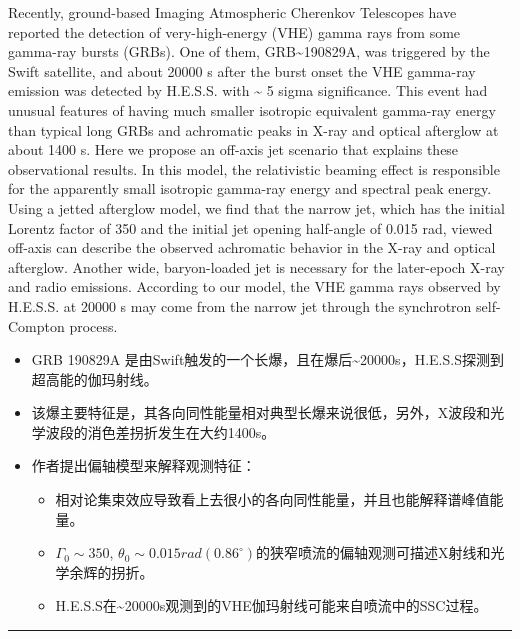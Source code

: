\documentclass[
]{article}
\begin{document}
Recently, ground-based Imaging Atmospheric Cherenkov Telescopes have
reported the detection of very-high-energy (VHE) gamma rays from some
gamma-ray bursts (GRBs). One of them, GRB\textasciitilde190829A, was
triggered by the Swift satellite, and about 20000 s after the burst
onset the VHE gamma-ray emission was detected by H.E.S.S. with
\textasciitilde{} 5 sigma significance. This event had unusual features
of having much smaller isotropic equivalent gamma-ray energy than
typical long GRBs and achromatic peaks in X-ray and optical afterglow at
about 1400 s. Here we propose an off-axis jet scenario that explains
these observational results. In this model, the relativistic beaming
effect is responsible for the apparently small isotropic gamma-ray
energy and spectral peak energy. Using a jetted afterglow model, we find
that the narrow jet, which has the initial Lorentz factor of 350 and the
initial jet opening half-angle of 0.015 rad, viewed off-axis can
describe the observed achromatic behavior in the X-ray and optical
afterglow. Another wide, baryon-loaded jet is necessary for the
later-epoch X-ray and radio emissions. According to our model, the VHE
gamma rays observed by H.E.S.S. at 20000 s may come from the narrow jet
through the synchrotron self-Compton process.

\begin{itemize}
\item
  GRB 190829A
  是由Swift触发的一个长爆，且在爆后\textasciitilde20000s，H.E.S.S探测到超高能的伽玛射线。
\item
  该爆主要特征是，其各向同性能量相对典型长爆来说很低，另外，X波段和光学波段的消色差拐折发生在大约1400s。
\item
  作者提出偏轴模型来解释观测特征：

  \begin{itemize}
  \item
    相对论集束效应导致看上去很小的各向同性能量，并且也能解释谱峰值能量。
  \item
    \(\Gamma_0 \sim 350\),
    \(\theta_0 \sim 0.015rad (0.86^{\circ})\)的狭窄喷流的偏轴观测可描述X射线和光学余辉的拐折。
  \item
    H.E.S.S在\textasciitilde20000s观测到的VHE伽玛射线可能来自喷流中的SSC过程。
  \end{itemize}
\end{itemize}

\begin{center}\rule{0.5\linewidth}{0.5pt}\end{center}
\end{document}
